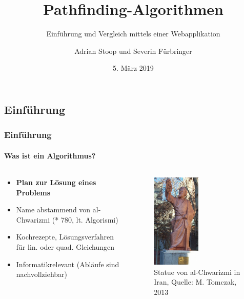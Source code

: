 \documentclass[professionalfont,serif,german]{beamer}
\title[Pathfinder-Vergleicher]{Pathfinding-Algorithmen}
\subtitle{Einführung und Vergleich mittels einer Webapplikation}
\author[A. Stoop, S. Fürbringer]{Adrian Stoop und Severin Fürbringer}
\institute[BMZ, EVT18a]{Berufsmaturitätsschule Zürich \\ \tiny{Technik,
Architektur, Life Sciences}}
\date{5. März 2019}
\begin{document}
\frame{\titlepage}


\begin{frame}
  \section[Einführung in Algorithmen und Pathfinder]{Einführung}
  \frametitle{Einführung}
  \framesubtitle{Was ist ein Algorithmus?}
  \begin{columns}[c] %
    \begin{column}[T]{.5\textwidth} %
      \begin{itemize}
        \item \textbf{Plan zur Lösung eines Problems}
        \item Name abstammend von al-Chwarizmi (* 780, lt. Algorismi)
        \item Kochrezepte, Lösungsverfahren für lin. oder quad. Gleichungen
        \item Informatikrelevant (Abläufe sind nachvollziehbar)
      \end{itemize}
    \end{column}
    \begin{column}[T]{.5\textwidth}
      \begin{figure}
        \includegraphics[height=4.5cm]{img/algorismi.png}
        \caption{Statue von al-Chwarizmi in Iran, Quelle: M. Tomczak, 2013}
      \end{figure}
    \end{column}
  \end{columns}
\end{frame}
\end{document}
